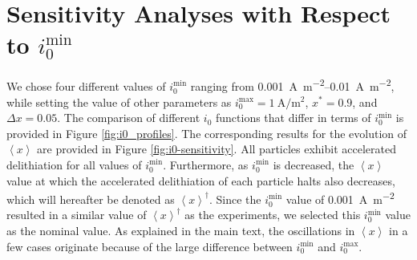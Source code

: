 \documentclass{article}
\begin{document}
\section{Sensitivity Analyses with Respect to $i_0^{\mathrm{min}}$}

We chose four different values of $i_0^{\mathrm{min}}$ ranging from
\SIrange{0.001}{0.01}{\ampere\per\meter\squared}, while setting the
value of other parameters as
$i_0^{\mathrm{max}}=\SI{1}{\ampere\per\meter\squared}$, $x^{\ast
}=0.9$, and $\Delta x=0.05$. The comparison of different $i_0$
functions that differ in terms of $i_0^{\mathrm{min}}$ is provided in
Figure \ref{fig:i0_profiles}. The corresponding results for the
evolution of $\left\langle x\right\rangle $ are provided in Figure
\ref{fig:i0-sensitivity}. All particles exhibit accelerated
delithiation for all values of $i_0^{\mathrm{min}}$. Furthermore, as
$i_0^{\mathrm{min}}$ is decreased, the $\left\langle x\right\rangle $
value at which the accelerated delithiation of each particle halts
also decreases, which will hereafter be denoted as $\left\langle
x\right\rangle^\dag$. Since the $i_0^{\mathrm{min}}$ value of
\SI{0.001}{\ampere\per\meter\squared} resulted in a similar value of
$\left\langle x\right\rangle^\dag$ as the experiments, we selected
this $i_0^{\mathrm{min}}$ value as the nominal value. As explained in
the main text, the oscillations in $\left\langle x\right\rangle $ in a
few cases originate because of the large difference between
$i_0^{\mathrm{min}}$ and $i_0^{\mathrm{max}}$.
\end{document}
